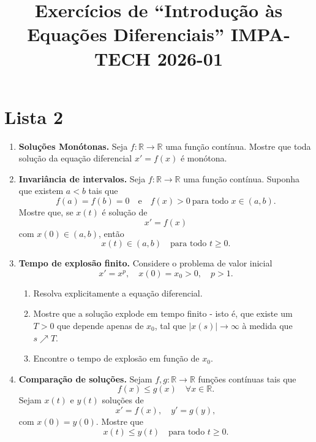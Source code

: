 \documentclass[a4paper,
11pt,  reqno]{amsart}
\title{Exercícios de ``Introdução às Equações Diferenciais''  IMPA-TECH 2026-01}
\begin{document}
\maketitle

\section*{Lista 2}
\begin{enumerate}
    \item \textbf{Soluções Monótonas.} Seja $f:\mathbb{R}\to \mathbb{R}$ uma função contínua. Mostre que toda solução da equação diferencial $x'=f(x)$ é monótona.

    \medskip

    \item {\bf Invari\^ancia de intervalos.} Seja $f:\mathbb{R}\to\mathbb{R}$ uma fun\c{c}\~ao cont\'inua. Suponha que existem $a<b$ tais que
    \[
    f(a)=f(b)=0 \quad \text{e} \quad f(x)>0 \ \text{para todo } x\in(a,b).
    \]
    Mostre que, se $x(t)$ \'e solu\c{c}\~ao de
    \[
    x' = f(x)
    \]
    com $x(0)\in(a,b)$, ent\~ao
    \[
    x(t)\in(a,b)\quad \text{para todo } t \ge 0.
    \]

    \item {\bf Tempo de explosão finito.} Considere o problema de valor inicial
    \[
    x' = x^p,\quad x(0)=x_0>0,\quad p>1.
    \]
    \begin{enumerate}
        \item Resolva explicitamente a equa\c{c}\~ao diferencial.
        \item Mostre que a solu\c{c}\~ao explode em tempo finito - isto é, que existe um $T > 0$ que depende apenas de $x_0$, tal que $|x(s)|\to \infty$ à medida que $s \nearrow T.$
        \item Encontre o tempo de explos\~ao em fun\c{c}\~ao de $x_0$.
    \end{enumerate}

    \medskip

    \item {\bf Compara\c{c}\~ao de solu\c{c}\~oes.} Sejam $f,g:\mathbb{R}\to\mathbb{R}$ fun\c{c}\~oes cont\'inuas tais que
    \[
    f(x)\le g(x)\quad \forall x\in\mathbb{R}.
    \]
    Sejam $x(t)$ e $y(t)$ solu\c{c}\~oes de
    \[
    x'=f(x), \quad y'=g(y),
    \]
    com $x(0)=y(0)$. Mostre que
    \[
    x(t)\le y(t)\quad \text{para todo } t\ge 0.
    \]

    

    \medskip


\end{enumerate}
\end{document}
